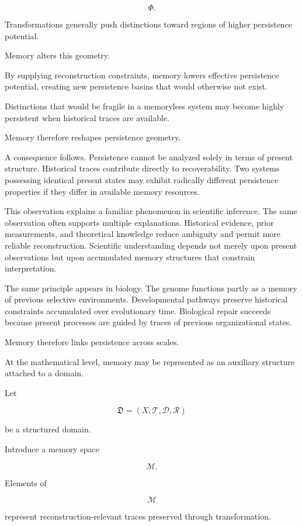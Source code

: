 \documentclass[12pt,oneside]{article}
\theoremstyle{definition}
\begin{document}
\[
\Phi.
\]

Transformations generally push distinctions toward regions of higher persistence potential.

Memory alters this geometry.

By supplying reconstruction constraints, memory lowers effective persistence potential, creating new persistence basins that would otherwise not exist.

Distinctions that would be fragile in a memoryless system may become highly persistent when historical traces are available.

Memory therefore reshapes persistence geometry.

A consequence follows. Persistence cannot be analyzed solely in terms of present structure. Historical traces contribute directly to recoverability. Two systems possessing identical present states may exhibit radically different persistence properties if they differ in available memory resources.

This observation explains a familiar phenomenon in scientific inference. The same observation often supports multiple explanations. Historical evidence, prior measurements, and theoretical knowledge reduce ambiguity and permit more reliable reconstruction. Scientific understanding depends not merely upon present observations but upon accumulated memory structures that constrain interpretation.

The same principle appears in biology. The genome functions partly as a memory of previous selective environments. Developmental pathways preserve historical constraints accumulated over evolutionary time. Biological repair succeeds because present processes are guided by traces of previous organizational states.

Memory therefore links persistence across scales.

At the mathematical level, memory may be represented as an auxiliary structure attached to a domain.

Let

\[
\mathfrak D
=
(X,\mathcal T,\mathcal D,\mathcal R)
\]

be a structured domain.

Introduce a memory space

\[
\mathcal M.
\]

Elements of

\[
\mathcal M
\]

represent reconstruction-relevant traces preserved through transformation.
\end{document}
